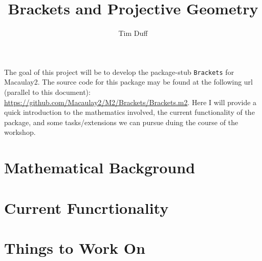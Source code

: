 \documentclass{article}
\title{Brackets and Projective Geometry}
\author{Tim Duff}
\begin{document}
\maketitle

The goal of this project will be to develop the package-stub \texttt{Brackets} for Macaulay2.
The source code for this package may be found at the following url (parallel to this document): \url{https://github.com/Macaulay2/M2/Brackets/Brackets.m2}.
Here I will provide a quick introduction to the mathematics involved, the current functionality of the package, and some tasks/extensions we can pursue duing the course of the workshop.

\section{Mathematical Background}

\section{Current Funcrtionality}

\section{Things to Work On}
\end{document}
